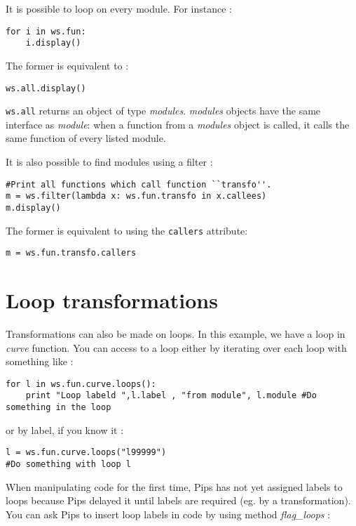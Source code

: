 \documentclass[a4paper]{article}
\begin{document}
It is possible to loop on every module. For instance :
\begin{lstlisting}
for i in ws.fun:
	i.display()
\end{lstlisting}

The former is equivalent to :
\begin{lstlisting}
ws.all.display()
\end{lstlisting}

\lstinline|ws.all| returns an object of type \emph{modules}.
\emph{modules} objects have the same interface as \emph{module}:
when a function from a \emph{modules} object is called, it calls the same function of every listed module.

It is also possible to find modules using a filter :
\begin{lstlisting}
#Print all functions which call function ``transfo''.
m = ws.filter(lambda x: ws.fun.transfo in x.callees)
m.display()
\end{lstlisting}

The former is equivalent to using the \lstinline|callers| attribute:
\begin{lstlisting}
m = ws.fun.transfo.callers
\end{lstlisting}

\section{Loop transformations}

Transformations can also be made on loops.
In this example, we have a loop in \emph{curve} function.
You can access to a loop either by iterating over each loop with something like :

\begin{lstlisting}
for l in ws.fun.curve.loops():
	print "Loop labeld ",l.label , "from module", l.module #Do something in the loop
\end{lstlisting}

or by label, if you know it :

\begin{lstlisting}
l = ws.fun.curve.loops("l99999")
#Do something with loop l
\end{lstlisting}

When manipulating code for the first time, Pips has not yet assigned labels to loops because Pips delayed it until labels are required (eg. by a transformation). You can ask Pips to insert loop labels in code by using method \emph{flag\_loops} :
\end{document}
